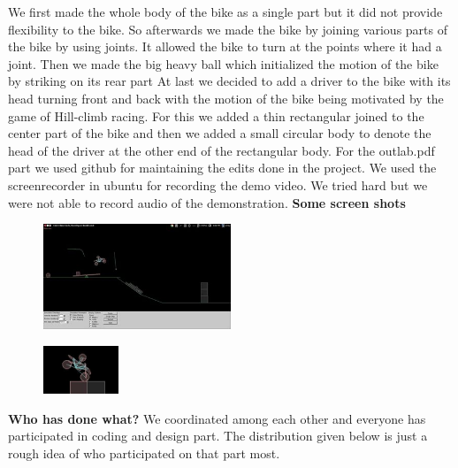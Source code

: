 \documentclass[17pt, a4paper]{extarticle}
\begin{document}
We first made the whole body of the bike as a single part but it did not provide flexibility to the bike. So afterwards we made the bike by joining various parts of the bike by using joints. It allowed the bike to turn at the points where it had a joint.
\newline
Then we made the big heavy ball which initialized the motion of the bike by striking on its rear part
\newline
At last we decided to add a driver to the bike with its head turning front and back with the motion of the bike being motivated by the game of Hill-climb racing. For this we added a thin rectangular joined to the center part of the bike and then we added a small circular body to denote the head of the driver at the other end of the rectangular body.
\newline
For the outlab.pdf part we used github for maintaining the edits done in the project. We used the screenrecorder in ubuntu for recording the demo video. We tried hard but we were not able to record audio of the demonstration.
\newpage
\color{red} 
\textbf{Some screen shots}
\color{black}
\newline \newline
\begin{figure}
\centering
	\includegraphics[width=0.5\textwidth]{fig1.png}
\end{figure}
\begin{figure}
\centering
	\includegraphics[width=0.2\textwidth]{fig2.png}
\end{figure}
\color{red}
\textbf{Who has done what?}\newline
\newline
\color{black}
We coordinated among each other and everyone has participated in coding and design part. The distribution given below is just a rough idea of who participated on that part most.
\newline
\end{document}
